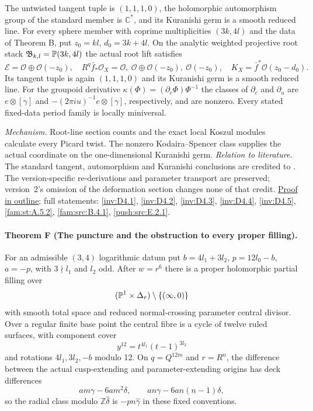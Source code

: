 \documentclass[11pt,a4paper]{article}
\theoremstyle{definition}
\newcommand{\C}{\mathbb C}\newcommand{\R}{\mathbb R}\newcommand{\Z}{\mathbb Z}\newcommand{\Q}{\mathbb Q}\newcommand{\N}{\mathbb N}\newcommand{\F}{\mathbb F}
\begin{document}
The untwisted tangent tuple is $(1,1,1,0)$, the holomorphic
automorphism group of the standard member is $\C^*$, and its
Kuranishi germ is a smooth reduced line.  For every sphere member
with coprime multiplicities $(3k,4l)$ and the data of Theorem B,
put $z_0=kl$, $d_0=3k+4l$.  On the analytic weighted projective root stack
$\mathfrak B_{k,l}=\mathbb P(3k,4l)$ the actual root lift satisfies
\[
 \mathcal E=\mathcal O\oplus\mathcal O(-z_0),\quad
 R^q\bar f_*\mathcal O_X=
 \mathcal O,\ \mathcal O\oplus\mathcal O(-z_0),\ \mathcal O(-z_0),
 \quad K_X=\bar f^*\mathcal O(z_0-d_0).
\]
Its tangent tuple is again $(1,1,1,0)$ and its Kuranishi germ is
a smooth reduced line.  For the groupoid derivative
$\kappa(\Phi)=(\partial_c\Phi)\Phi^{-1}$ the classes of
$\partial_c$ and $\partial_u$ are
$e\otimes[\gamma]$ and $-(2\pi i u)^{-1}e\otimes[\gamma]$,
respectively, and are nonzero.  Every stated fixed-data period
family is locally miniversal.

\textit{Mechanism.} Root-line section counts and the exact local
Koszul modules calculate every Picard twist.  The nonzero
Kodaira--Spencer class supplies the actual coordinate on the
one-dimensional Kuranishi germ.
\textit{Relation to literature.} The standard tangent, automorphism
and Kuranishi conclusions are credited to
\cite[Theorems~1.3--1.4, p.~3; Theorem~6.12, pp.~81--82;
Theorem~6.16, p.~85]{DuEtAl2026v1}.  The version-specific
re-derivations and parameter transport are preserved; version~2's
omission of the deformation section changes none of that credit.
\hyperlink{outline-I-E}{Proof in outline}; full statements:
\ref{inv:D4.1}, \ref{inv:D4.2}, \ref{inv:D4.3},
\ref{inv:D4.4}, \ref{inv:D4.5}, \ref{fam:st:A.5.2},
\ref{fam:src:B.4.1}, \ref{push:src:E.2.1}.

\hypertarget{main-I-F}{}
\paragraph{Theorem F (The puncture and the obstruction to every proper filling).}
\label{series:I:F}
For an admissible $(3,4)$ logarithmic datum put
$b=4l_1+3l_2$, $p=12l_0-b$, $a=-p$, with
$3\nmid l_1$ and $l_2$ odd.  After $w=r^6$ there is a proper
holomorphic partial filling over
\[
 (\mathbb P^1\times\Delta_r)\setminus\{(\infty,0)\}
\]
with smooth total space and reduced normal-crossing parameter
central divisor.  Over a regular finite base point the central
fibre is a cycle of twelve ruled surfaces, with component cover
\[
 y^{12}=t^{4l_1}(t-1)^{3l_2}
\]
and rotations $4l_1,3l_2,-b$ modulo 12.
On $q=Q^{12m}$ and $r=R^n$, the difference between the actual
cusp-extending and parameter-extending origins has deck
differences
\[
 am\gamma-6am^2\delta,\qquad
 an\gamma-6an(n-1)\delta,
\]
so the radial class modulo $\Z\widehat\delta$ is
$-pn\widehat\gamma$ in these fixed conventions.
\end{document}
